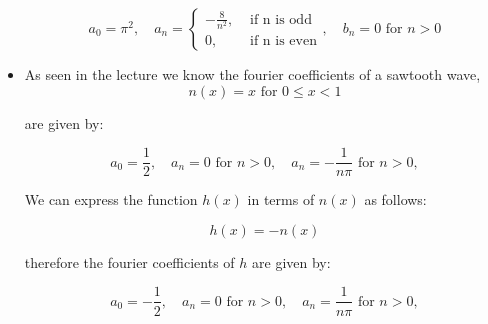 \documentclass[11pt]{article}
\begin{document}
\begin{solution}
\begin{itemize}
$$
a_0 = \pi^2, \quad a_n = \begin{cases}-\frac{8}{n^2}, & \text { if n is odd} \\ 0, & \text{ if n is even}\end{cases}, \quad b_n = 0 \text{ for } n > 0
$$
\item As seen in the lecture we know the fourier coefficients of a sawtooth wave,
$$
n(x)=x \text { for } 0 \leq x<1
$$

are given by:

$$
a_0 = \frac{1}{2}, \quad a_n = 0 \text{ for } n > 0,  \quad a_n = -\frac{1}{n\pi} \text{ for } n > 0,
$$

We can express the function $h(x)$ in terms of $n(x)$ as follows:

$$
h(x) = -n(x)
$$

therefore the fourier coefficients of $h$ are given by:

$$
a_0 = -\frac{1}{2}, \quad a_n = 0 \text{ for } n > 0,  \quad a_n = \frac{1}{n\pi} \text{ for } n > 0,
$$
\end{itemize}
\end{solution}
\end{document}
